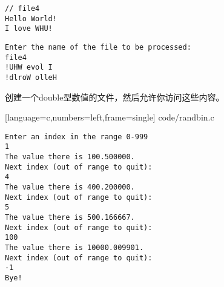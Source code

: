 \begin{frame}[fragile]
  \begin{lstlisting}[backgroundcolor=\color{red!20}]
// file4    
Hello World!
I love WHU!    
  \end{lstlisting}
  \begin{lstlisting}[backgroundcolor=\color{red!20}]
Enter the name of the file to be processed: 
file4
!UHW evol I
!dlroW olleH    
  \end{lstlisting}
\end{frame}


\begin{frame}[fragile]
  \begin{li}
    创建一个{\tf double}型数值的文件，然后允许你访问这些内容。
  \end{li}
\end{frame}

\begin{frame}
  
  [language=c,numbers=left,frame=single]
  {code/randbin.c}
\end{frame}


\begin{frame}
  \begin{lstlisting}[backgroundcolor=\color{red!20}]
Enter an index in the range 0-999
1
The value there is 100.500000.
Next index (out of range to quit):
4
The value there is 400.200000.
Next index (out of range to quit):
5
The value there is 500.166667.
Next index (out of range to quit):
100
The value there is 10000.009901.
Next index (out of range to quit):
-1
Bye!    
  \end{lstlisting}
\end{frame}
